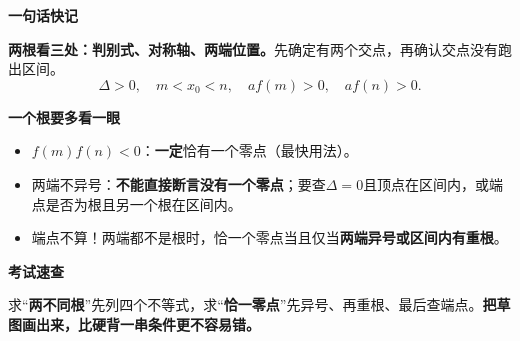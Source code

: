 \clearpage
\begin{summarybox}
\textbf{\textcolor{CSummary}{一句话快记}}\par
\textbf{两根看三处：判别式、对称轴、两端位置。}先确定有两个交点，再确认交点没有跑出区间。
\[\boxed{\Delta>0,\quad m<x_0<n,\quad af(m)>0,\quad af(n)>0.}\]
\begin{center}

\end{center}
\textbf{\textcolor{CSummary}{一个根要多看一眼}}\par
\begin{itemize}[leftmargin=*,itemsep=.3em]
 \item $f(m)f(n)<0$：\textbf{一定}恰有一个零点（最快用法）。
 \item 两端不异号：\textbf{不能直接断言没有一个零点}；要查$\Delta=0$且顶点在区间内，或端点是否为根且另一个根在区间内。
 \item 端点不算！两端都不是根时，恰一个零点当且仅当\textbf{两端异号或区间内有重根}。
\end{itemize}
\textbf{\textcolor{CSummary}{考试速查}}\par
求“\textbf{两不同根}”先列四个不等式，求“\textbf{恰一零点}”先异号、再重根、最后查端点。\textbf{把草图画出来，比硬背一串条件更不容易错。}
\end{summarybox}
